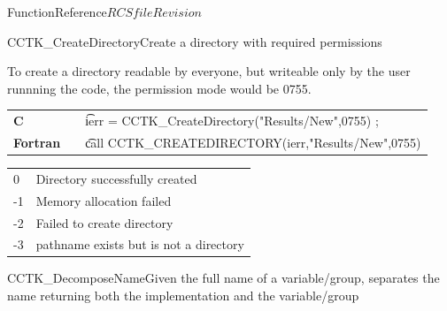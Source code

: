 \begin{cactuspart}{FunctionReference}{$RCSfile$}{$Revision$}
\begin{CCTKFunc}{CCTK\_CreateDirectory}{Create a directory with required permissions}
\label{CCTK-CreateDirectory}
\showargs
\begin{params}
\end{params}
\begin{discussion}
To create a directory readable by everyone, but writeable only by the user runnning the code, the permission mode would be 0755.
\end{discussion}
\begin{examples}
\begin{tabular}{@{}p{3cm}cp{11cm}}
\hfill {\bf C} && {\t ierr = CCTK\_CreateDirectory("Results/New",0755) };
\\
\hfill {\bf Fortran} && {\t call CCTK\_CREATEDIRECTORY(ierr,"Results/New",0755)}
\\
\end{tabular}
\end{examples}
\begin{errorcodes}
\begin{tabular}{ll}
0 & Directory successfully created\\
-1 & Memory allocation failed\\
-2 & Failed to create directory\\
-3 & pathname exists but is not a directory\\
\end{tabular}
\end{errorcodes}
\end{CCTKFunc}




\begin{CCTKFunc}{CCTK\_DecomposeName}{Given the full name of a variable/group, separates the name returning both the implementation and the variable/group}
\label{CCTK-DecomposeName}
\showcargs
\begin{params}
\end{params}
\begin{discussion}


\end{discussion}
\end{CCTKFunc}
\end{cactuspart}
